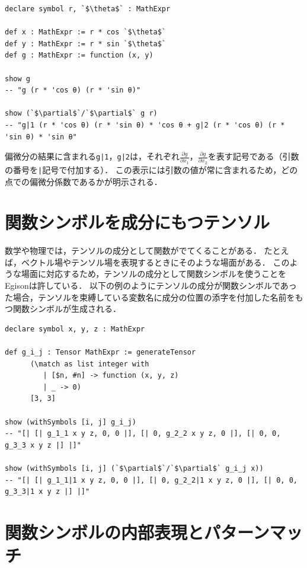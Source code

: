 \begin{lstlisting}[language=egison,numbers=none]
declare symbol r, `$\theta$` : MathExpr

def x : MathExpr := r * cos `$\theta$`
def y : MathExpr := r * sin `$\theta$`
def g : MathExpr := function (x, y)

show g
-- "g (r * 'cos θ) (r * 'sin θ)"

show (`$\partial$`/`$\partial$` g r)
-- "g|1 (r * 'cos θ) (r * 'sin θ) * 'cos θ + g|2 (r * 'cos θ) (r * 'sin θ) * 'sin θ"
\end{lstlisting}

偏微分の結果に含まれる\verb!g|1!，\verb!g|2!は，それぞれ$\frac{\partial g}{\partial x_1}$，$\frac{\partial g}{\partial x_2}$を表す記号である（引数の番号を\verb!|!記号で付加する）．
この表示には引数の値が常に含まれるため，どの点での偏微分係数であるかが明示される．

\section{関数シンボルを成分にもつテンソル}\label{funcsym-tensor}

数学や物理では，テンソルの成分として関数がでてくることがある．
たとえば，ベクトル場やテンソル場を表現するときにそのような場面がある．
このような場面に対応するため，テンソルの成分として関数シンボルを使うことをEgisonは許している．
以下の例のようにテンソルの成分が関数シンボルであった場合，テンソルを束縛している変数名に成分の位置の添字を付加した名前をもつ関数シンボルが生成される．

\begin{lstlisting}[language=egison,numbers=none]
declare symbol x, y, z : MathExpr

def g_i_j : Tensor MathExpr := generateTensor
      (\match as list integer with
         | [$n, #n] -> function (x, y, z)
         | _ -> 0)
      [3, 3]

show (withSymbols [i, j] g_i_j)
-- "[| [| g_1_1 x y z, 0, 0 |], [| 0, g_2_2 x y z, 0 |], [| 0, 0, g_3_3 x y z |] |]"

show (withSymbols [i, j] (`$\partial$`/`$\partial$` g_i_j x))
-- "[| [| g_1_1|1 x y z, 0, 0 |], [| 0, g_2_2|1 x y z, 0 |], [| 0, 0, g_3_3|1 x y z |] |]"
\end{lstlisting}

\section{関数シンボルの内部表現とパターンマッチ}\label{funcsym-data}


